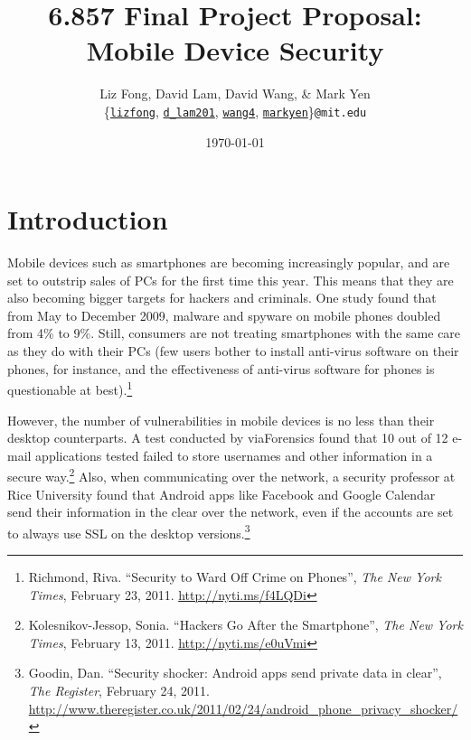 \documentclass[11pt]{article}
\begin{document}
\title{6.857 Final Project Proposal: Mobile Device Security}
\author{Liz Fong, David Lam, David Wang, \& Mark Yen\\
\{\href{mailto:lizfong@mit.edu}{\texttt{lizfong}},
\href{mailto:d_lam201@mit.edu}{\texttt{d\_lam201}},
\href{mailto:wang4@mit.edu}{\texttt{wang4}},
\href{mailto:markyen@mit.edu}{\texttt{markyen}}\}\texttt{@mit.edu}}
\date{\today}
\maketitle

\section{Introduction}
Mobile devices such as smartphones are becoming increasingly popular, and are
set to outstrip sales of PCs for the first time this year. This means that they
are also becoming bigger targets for hackers and criminals. One study found
that from May to December 2009, malware and spyware on mobile phones doubled
from 4\% to 9\%. Still, consumers are not treating smartphones with the same
care as they do with their PCs (few users bother to install anti-virus software
on their phones, for instance, and the effectiveness of anti-virus software for
phones is questionable at best).\footnote{Richmond, Riva. ``Security to Ward Off
Crime on Phones'', \textit{The New York Times}, February 23, 2011.
\url{http://nyti.ms/f4LQDi}}

However, the number of vulnerabilities in mobile devices is no less than their
desktop counterparts. A test conducted by viaForensics found that 10 out of 12
e-mail applications tested failed to store usernames and other information in a
secure way.\footnote{Kolesnikov-Jessop, Sonia. ``Hackers Go After the
Smartphone'', \textit{The New York Times}, February 13, 2011.
\url{http://nyti.ms/e0uVmi}} Also, when communicating over the network, a
security professor at Rice University found that Android apps like Facebook and
Google Calendar send their information in the clear over the network, even if
the accounts are set to always use SSL on the desktop
versions.\footnote{Goodin, Dan. ``Security shocker: Android apps send private
data in clear'', \textit{The Register}, February 24, 2011.
\url{http://www.theregister.co.uk/2011/02/24/android_phone_privacy_shocker/}}
\end{document}
